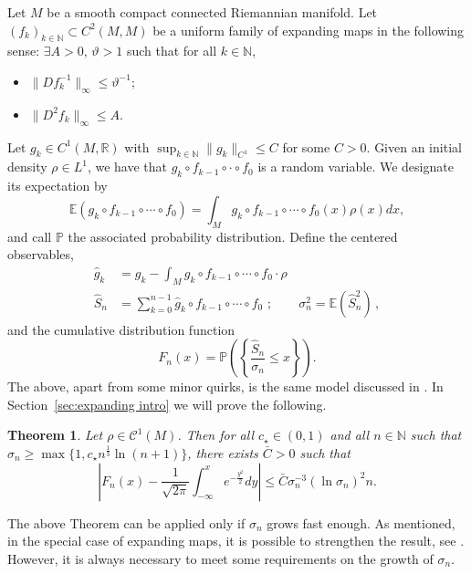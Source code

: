 \documentclass{amsart}
\numberwithin{equation}{section}
\newtheorem{thm}{Theorem}[section]
\newcommand\cC{{\mathcal C}}
\newcommand\bE{{\mathbb E}}
\newcommand\bN{{\mathbb N}}
\newcommand\bP{{\mathbb P}}
\newcommand\bR{{\mathbb R}}
\begin{document}
Let $M$ be a smooth compact connected Riemannian manifold.
Let $(f_k)_{k \in \bN} \subset C^2(M,M)$ be a uniform family of expanding maps in the following sense:  $\exists A>0$, $\vartheta >1$ such that for all $k \in \bN$,
\begin{itemize}
  \item $\|Df_k^{-1}\|_\infty \leq \vartheta^{-1}$;
  \item $\|D^2f_k\|_\infty\leq A$.
\end{itemize}
Let $g_k\in C^1(M,\bR)$ with $\sup_{k \in \bN} \| g_k \|_{C^1} \le C$ for some $C>0$.
Given an initial density $\rho\in L^1$, we have that $g_k\circ f_{k-1}\circ \cdot\circ f_0$ is a random variable. We designate its expectation by
\[
\bE(g_k\circ f_{k-1}\circ \cdots\circ f_0)=\int_M g_k\circ f_{k-1}\circ \cdots\circ f_0(x) \rho(x) dx,
\]
and call $\bP$ the associated probability distribution.
 Define the centered observables,
\begin{equation}\label{eq:centered}
\begin{split}
\hat{g}_k & = g_k - \int_M g_k \circ f_{k-1} \circ \cdots \circ f_0\cdot  \rho  \\
\hat{S}_n & = \sum_{k=0}^{n-1} \hat{g}_k \circ f_{k-1} \circ \cdots \circ f_0 \,\, ; \qquad \sigma_n^2 = \mathbb{E}(\hat{S}_n^2)\, ,
\end{split}
\end{equation}
and the cumulative distribution function
\begin{equation}\label{eq:cumulative}
F_n(x) = \mathbb{P}\left( \left\{ \frac{ \hat{S}_n }{\sigma_n} \le x \right\} \right) .
\end{equation}
The above, apart from some minor quirks, is the same model discussed in \cite{CR07,NMTV, H20}.
In Section~\ref{sec:expanding intro} we will prove the following.
\begin{thm}
\label{thm:expanding CLT}
Let  $\rho \in \cC^1(M)$. Then for all $c_\star\in (0,1)$ and all $n\in\bN$ such that $\sigma_n\geq \max\{1,c_\star n^{\frac 13}\ln (n+1)\}$, there exists $\bar C>0$ such that
\[
\left|F_n(x)-\frac{1}{\sqrt{2\pi}}\int_{-\infty}^xe^{-\frac {y^2}2}dy\right|\leq \bar C \sigma_n^{-3}(\ln \sigma_n)^2 n.
\]
\end{thm}

\noindent The above Theorem can be applied only if $\sigma_n$ grows fast enough. As mentioned, in the special case of expanding maps, it is possible to strengthen the result, see \cite{DH24}. However, it is always necessary to meet some requirements on the growth of $\sigma_n$.
\end{document}
